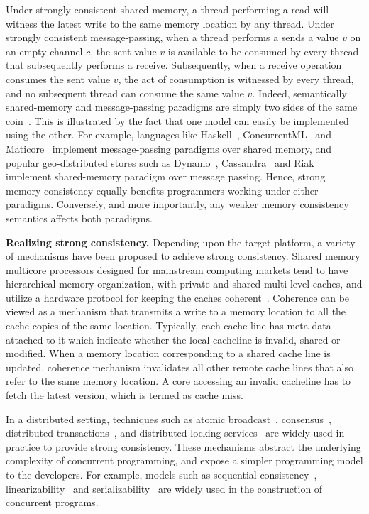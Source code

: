 Under strongly consistent shared memory, a thread performing a read will
witness the latest write to the same memory location by any thread. Under
strongly consistent message-passing, when a thread performs a sends a value $v$
on an empty channel $c$, the sent value $v$ is available to be consumed by
every thread that subsequently performs a receive. Subsequently, when a receive
operation consumes the sent value $v$, the act of consumption is witnessed by
every thread, and no subsequent thread can consume the same value $v$. Indeed,
semantically shared-memory and message-passing paradigms are simply two sides
of the same coin~\cite{Turon2013,Lauer1979}. This is illustrated by the fact
that one model can easily be implemented using the other. For example,
languages like Haskell~\cite{Haskell}, ConcurrentML~\cite{CML} and
Maticore~\cite{Manticore} implement message-passing paradigms over shared
memory, and popular geo-distributed stores such as Dynamo~\cite{Dynamo},
Cassandra~\cite{Cassandra} and Riak~\cite{Riak} implement shared-memory
paradigm over message passing. Hence, strong memory consistency equally
benefits programmers working under either paradigms. Conversely, and more
importantly, any weaker memory consistency semantics affects both paradigms.

\noindent \textbf{Realizing strong consistency.} Depending upon the target
platform, a variety of mechanisms have been proposed to achieve strong
consistency. Shared memory multicore processors designed for mainstream
computing markets tend to have hierarchical memory organization, with private
and shared multi-level caches, and utilize a hardware protocol for keeping the
caches coherent~\cite{Martin2012}. Coherence can be viewed as a mechanism that
transmits a write to a memory location to all the cache copies of the same
location. Typically, each cache line has meta-data attached to it which
indicate whether the local cacheline is invalid, shared or modified. When a
memory location corresponding to a shared cache line is updated, coherence
mechanism invalidates all other remote cache lines that also refer to the same
memory location. A core accessing an invalid cacheline has to fetch the latest
version, which is termed as cache miss.

In a distributed setting, techniques such as atomic broadcast~\cite{},
consensus~\cite{}, distributed transactions~\cite{}, and distributed locking
services~\cite{} are widely used in practice to provide strong consistency.
These mechanisms abstract the underlying complexity of concurrent programming,
and expose a simpler programming model to the developers. For example, models
such as sequential consistency~\cite{Lam79}, linearizability~\cite{} and
serializability~\cite{} are widely used in the construction of concurrent
programs.


